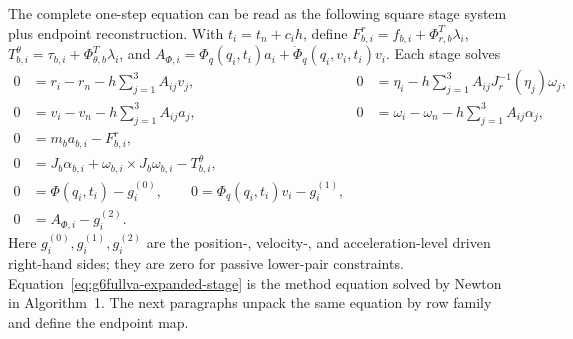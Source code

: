 \documentclass[preprint,12pt]{elsarticle}
\begin{document}
The complete one-step equation can be read as the following square stage
system plus endpoint reconstruction.  With $t_i=t_n+c_i h$, define
$F^r_{b,i}=f_{b,i}+\Phi_{r,b}^T\lambda_i$,
$T^\theta_{b,i}=\tau_{b,i}+\Phi_{\theta,b}^T\lambda_i$, and
$A_{\Phi,i}=\Phi_q(q_i,t_i)a_i+\dot{\Phi}_q(q_i,v_i,t_i)v_i$.  Each stage
solves
\begin{equation}
\label{eq:g6fullva-expanded-stage}
\begin{aligned}
0 &= r_i-r_n-h\sum_{j=1}^3 A_{ij}v_j, &
0 &= \eta_i-h\sum_{j=1}^3 A_{ij}J_r^{-1}(\eta_j)\omega_j,\\
0 &= v_i-v_n-h\sum_{j=1}^3 A_{ij}a_j, &
0 &= \omega_i-\omega_n-h\sum_{j=1}^3 A_{ij}\alpha_j,\\
0 &= m_b a_{b,i}-F^r_{b,i},\\
0 &= J_b\alpha_{b,i}+\omega_{b,i}\times J_b\omega_{b,i}-T^\theta_{b,i},\\
0 &= \Phi(q_i,t_i)-g_i^{(0)},\qquad
0 = \Phi_q(q_i,t_i)v_i-g_i^{(1)},\\
0 &= A_{\Phi,i}-g_i^{(2)} .
\end{aligned}
\end{equation}
Here $g_i^{(0)},g_i^{(1)},g_i^{(2)}$ are the position-, velocity-, and
acceleration-level driven right-hand sides; they are zero for passive
lower-pair constraints.  Equation~\eqref{eq:g6fullva-expanded-stage} is the
method equation solved by Newton in Algorithm~1.  The next paragraphs unpack
the same equation by row family and define the endpoint map.
\end{document}
